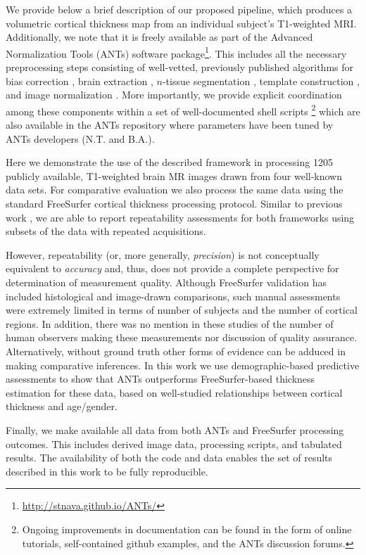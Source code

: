 We provide below a brief description of our proposed pipeline, which produces a volumetric
cortical thickness map from an individual subject's T1-weighted MRI.
Additionally, we note that it is freely available as part of the Advanced Normalization Tools
(ANTs) software package\footnote{\href{http://stnava.github.io/ANTs/}{http://stnava.github.io/ANTs/}}.  This includes all the necessary preprocessing steps consisting
of well-vetted, previously published algorithms for bias correction \citep{tustison2010},
brain extraction \citep{avants2010a}, $n$-tissue segmentation \citep{avants2011a},
template construction \citep{avants2010}, and image normalization \citep{avants2011}.
More importantly, we provide explicit coordination among
these components within a set of well-documented shell scripts%
\footnote{
Ongoing improvements in documentation can be found in the form of online tutorials, 
self-contained github examples, and the ANTs discussion forums.
}
which are also available in the ANTs repository where parameters have been tuned
by ANTs developers (N.T. and B.A.).  

Here we demonstrate the use of the described framework in processing
1205 publicly available, T1-weighted brain MR images drawn from four
well-known data sets.  For comparative evaluation we also process the
same data using the standard FreeSurfer cortical thickness processing
protocol.  Similar to previous work \citep[e.g.,][]{clarkson2011}, we
are able to report repeatability assessments for both frameworks using
subsets of the data with repeated acquisitions.

However, repeatability (or, more generally, {\it precision}) is not
conceptually equivalent to {\it accuracy} and, thus, does not provide
a complete perspective for determination of measurement quality.
Although FreeSurfer validation has included histological
\citep{rosas2002} and image-drawn \citep{kuperberg2003} comparisons,
such manual assessments were extremely limited in terms of number of
subjects and the number of cortical regions.  In addition, there was
no mention in these studies of the number of human observers making
these measurements nor discussion of quality assurance.
Alternatively, without ground truth other forms of evidence can be
adduced \citep[e.g.,][]{bouix2007} in making comparative inferences.
In this work we use demographic-based predictive assessments to show
that ANTs outperforms FreeSurfer-based thickness estimation for these
data, based on well-studied relationships between cortical thickness
and age/gender.

Finally, we make available all data from both ANTs and FreeSurfer 
processing outcomes.  This includes derived image data, processing scripts, 
and tabulated results.  The availability of both the code and data enables
the set of results described in this work to be fully reproducible.  
